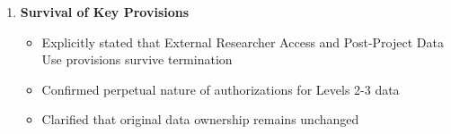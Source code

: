 \begin{enumerate}
\item \textbf{Survival of Key Provisions}
   \begin{itemize}
   \item Explicitly stated that External Researcher Access and Post-Project Data Use provisions survive termination
   \item Confirmed perpetual nature of authorizations for Levels 2-3 data
   \item Clarified that original data ownership remains unchanged
   \end{itemize}
\end{enumerate}

